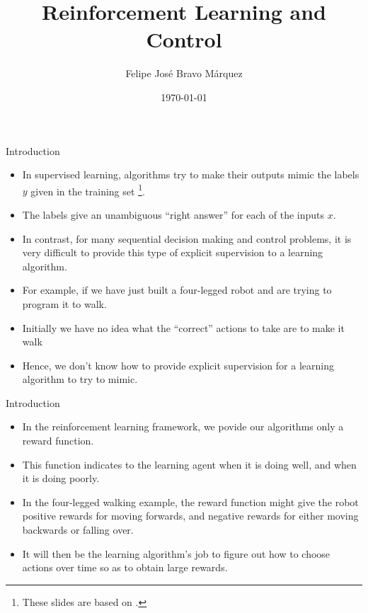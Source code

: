\documentclass[handout]{beamer}
\title{Reinforcement Learning and Control}
\author[Felipe Bravo Márquez]{\footnotesize
 \textcolor[rgb]{0.00,0.00,1.00}{Felipe José Bravo Márquez}}
\date{ \today }
\begin{document}
\begin{frame}
\titlepage


\end{frame}




\begin{frame}{Introduction}
\scriptsize{
\begin{itemize}
\item In supervised learning, algorithms try to make their outputs mimic the labels $y$ given in the training set \footnote{These slides are based on \cite{ng2000cs229}.}. 
\item The labels give an unambiguous ``right answer'' for each of the inputs $x$.
\item In contrast, for many sequential decision making and control problems, it is very difficult to provide this type of explicit supervision to a learning algorithm.
\item For example, if we have just built a four-legged robot and are trying to program it to walk.
\item Initially we have no idea what the ``correct'' actions to take are to make it walk
\item Hence, we don't know how to provide explicit supervision for a learning algorithm to try to mimic.
\end{itemize}


} 

\end{frame}


\begin{frame}{Introduction}
\scriptsize{
\begin{itemize}
\item In the reinforcement learning framework, we povide our algorithms only a reward function.
\item This function indicates to the learning agent when it is doing well, and when it is doing poorly. 
\item In the four-legged walking example, the reward function might give the robot positive rewards for moving forwards, and negative rewards for either moving backwards or falling over.
\item It will then be the learning algorithm's job to figure out how to choose actions
over time so as to obtain large rewards.
\end{itemize}


} 

\end{frame}
\end{document}
